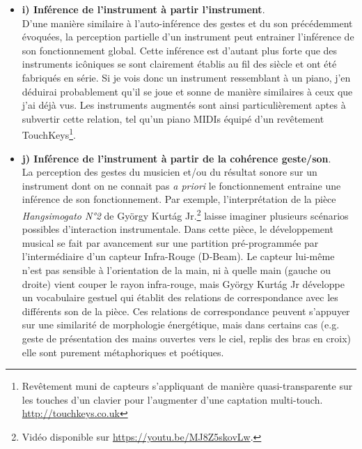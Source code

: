 \begin{itemize}[noitemsep]
	\item \textbf{i) Inférence de l'instrument à partir l'instrument}.\\
	D'une manière similaire à l'auto-inférence des gestes et du son précédemment évoquées, la perception partielle d'un instrument peut entrainer l'inférence de son fonctionnement global. Cette inférence est d'autant plus forte que des instruments icôniques se sont clairement établis au fil des siècle et ont été fabriqués en série. Si je vois donc un instrument ressemblant à un piano, j'en déduirai probablement qu'il se joue et sonne de manière similaires à ceux que j'ai déjà vus. Les instruments augmentés sont ainsi particulièrement aptes à subvertir cette relation, tel qu'un piano \glspl{MIDI} équipé d'un revêtement TouchKeys\footnote{Revêtement muni de capteurs s'appliquant de manière quasi-transparente sur les touches d'un clavier pour l'augmenter d'une captation multi-touch. \url{http://touchkeys.co.uk}}.

	\item \textbf{j) Inférence de l'instrument à partir de la cohérence geste/son}.\\
	La perception des gestes du musicien et/ou du résultat sonore sur un instrument dont on ne connait pas \textit{a priori} le fonctionnement entraine une inférence de son fonctionnement. Par exemple, l'interprétation de la pièce \textit{Hangsimogato N°2} de György Kurtág Jr.\footnote{Vidéo disponible sur \url{https://youtu.be/MJ8Z5skovLw}.} laisse imaginer plusieurs scénarios possibles d'interaction instrumentale. Dans cette pièce, le développement musical se fait par avancement sur une partition pré-programmée par l'intermédiaire d'un capteur Infra-Rouge (D-Beam). Le capteur lui-même n'est pas sensible à l'orientation de la main, ni à quelle main (gauche ou droite) vient couper le rayon infra-rouge, mais György Kurtág Jr développe un vocabulaire gestuel qui établit des relations de correspondance avec les différents son de la pièce. Ces relations de correspondance peuvent s'appuyer sur une similarité de morphologie énergétique, mais dans certains cas (e.g. geste de présentation des mains ouvertes vers le ciel, replis des bras en croix) elle sont purement métaphoriques et poétiques.


\end{itemize}
